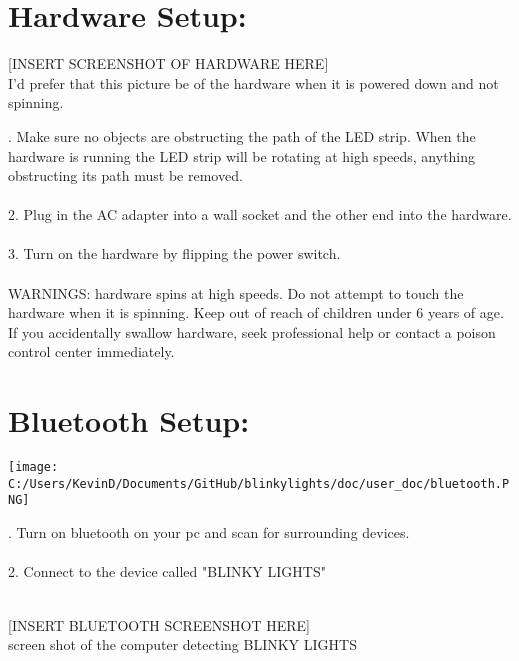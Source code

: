 \documentclass[12pt, a4paper]{ article}
\begin{document}
\newpage
{}
\section*{Hardware Setup:} 
\vspace{1cm}


\begin{center}
[INSERT SCREENSHOT OF  HARDWARE HERE]\\
I'd prefer that this picture be of the hardware when it is powered down and not spinning.
\end{center}


\vspace{1cm}
. Make sure no objects are obstructing the path of the LED strip. When the hardware is running the LED strip will be rotating at high speeds,  anything obstructing its path must be removed.\\\\
2. Plug in the AC adapter into a wall socket and the other end into the hardware.
\\\\
3. Turn on the hardware by flipping the power switch.
\\\\
WARNINGS: hardware spins at high speeds. Do not attempt to touch the hardware when it is spinning. 
Keep out of reach of children under 6 years of age. If you accidentally swallow hardware, seek professional help or contact a poison control center immediately.






\newpage
{}
\section*{Bluetooth Setup:} 
\vspace{1cm}

\begin{center}
\texttt{[image: C:/Users/KevinD/Documents/GitHub/blinkylights/doc/user\_doc/bluetooth.PNG]}
\end{center}

\vspace{1cm}
. Turn on bluetooth on your pc and scan for surrounding devices.
\\\\
2. Connect to the device called "BLINKY LIGHTS"
\\\\
\begin{center}
[INSERT BLUETOOTH SCREENSHOT HERE]\\
screen shot of the computer detecting BLINKY LIGHTS
\end{center}
\end{document}
